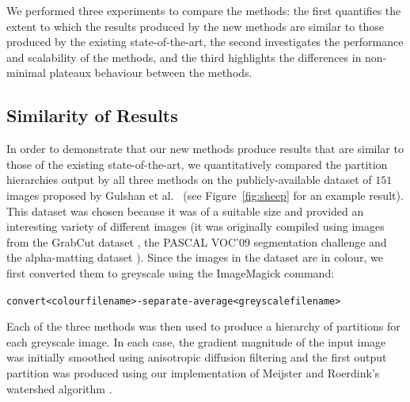 \documentclass[preprint,a4paper]{elsarticle}
\begin{document}
We performed three experiments to compare the methods: the first quantifies the extent to which the results produced by the new methods are similar to those produced by the existing state-of-the-art, the second investigates the performance and scalability of the methods, and the third highlights the differences in non-minimal plateaux behaviour between the methods.

\subsection{Similarity of Results}
\label{subsec:experiments-similarity}

In order to demonstrate that our new methods produce results that are similar to those of the existing state-of-the-art, we quantitatively compared the partition hierarchies output by all three methods on the publicly-available dataset of $151$ images proposed by Gulshan et al.\ \cite{gulshan10} (see Figure~\ref{fig:sheep} for an example result). This dataset was chosen because it was of a suitable size and provided an interesting variety of different images (it was originally compiled using images from the GrabCut dataset \cite{rother04}, the PASCAL VOC'09 segmentation challenge \cite{everingham09} and the alpha-matting dataset \cite{rhemann09}). Since the images in the dataset are in colour, we first converted them to greyscale using the ImageMagick \cite{imagemagick} command:
%
\begin{alltt}\begin{center}
convert <colour filename> -separate -average <greyscale filename>
\end{center}\end{alltt}
%
Each of the three methods was then used to produce a hierarchy of partitions for each greyscale image. In each case, the gradient magnitude of the input image was initially smoothed using anisotropic diffusion filtering \cite{perona90} and the first output partition was produced using our implementation of Meijster and Roerdink's watershed algorithm \cite{meijster98}.
\end{document}
